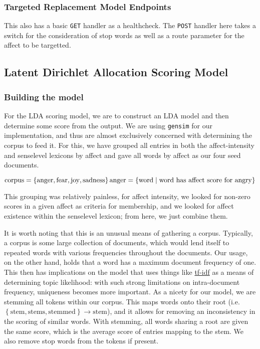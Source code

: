 \documentclass[11pt, twoside, reqno]{book}
\begin{document}
\subsubsection{\textbf{Targeted Replacement Model Endpoints}}

This also has a basic \texttt{GET} handler as a healthcheck. The \texttt{POST} handler here takes a switch for the consideration of stop words as well as a route parameter for the affect to be targetted.

\subsection{Latent Dirichlet Allocation Scoring Model}

\subsubsection{\textbf{Building the model}}

For the LDA scoring model, we are to construct an LDA model and then determine some score from the output. We are using \texttt{gensim} for our implementation, and thus are almost exclusively concerned with determining the corpus to feed it. For this, we have grouped all entries in both the affect-intensity and senselevel lexicons by affect and gave all words by affect as our four seed documents.

$$\text{corpus} = \left\{\text{anger}, \text{fear}, \text{joy}, \text{sadness}\right\}\\\text{anger} = \left\{\text{word}\mid \text{word has affect score for angry}\right\}$$

This grouping was relatively painless, for affect intensity, we looked for non-zero scores in a given affect as criteria for membership, and we looked for affect existence within the senselevel lexicon; from here, we just combine them.

It is worth noting that this is an unusual means of gathering a corpus. Typically, a corpus is some large collection of documents, which would lend itself to repeated words with various frequencies throughout the documents. Our usage, on the other hand, holds that a word has a maximum document frequency of one. This then has implications on the model that uses things like \href{http://jmlr.csail.mit.edu/papers/v3/blei03a.html}{tf-idf} as a means of determining topic likelihood: with such strong limitations on intra-document frequency, uniqueness becomes more important. As a nicety for our model, we are stemming all tokens within our corpus. This maps words onto their root (i.e. $\left\{ \text{stem}, \text{stems}, \text{stemmed} \right\} \rightarrow \text{stem} $), and it allows for removing an inconsistency in the scoring of similar words. With stemming, all words sharing a root are given the same score, which is the average score of entries mapping to the stem. We also remove stop words from the tokens if present.
\end{document}
